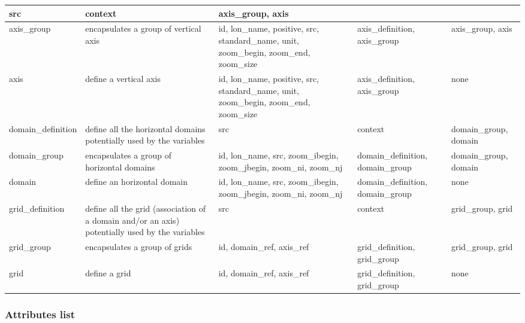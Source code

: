 \documentclass[NEMO_book]{subfiles}
\begin{document}
\begin{longtable}{|p{2.2cm}|p{2.5cm}|p{3.5cm}|p{2.2cm}|p{1.6cm}|}
   src &
   context &  
   axis\_group, axis \\
   \hline   
   axis\_group & 
   encapsulates a group of vertical axis &
   id, lon\_name, positive, src, standard\_name, unit, zoom\_begin, zoom\_end, zoom\_size &
   axis\_definition, axis\_group & 
   axis\_group, axis \\
   \hline   
   axis & 
   define a vertical axis &
   id, lon\_name, positive, src, standard\_name, unit, zoom\_begin, zoom\_end, zoom\_size &
   axis\_definition, axis\_group  & 
   none \\
   \hline   
   \hline   
   domain\_\-definition & 
   define all the horizontal domains potentially used by the variables &
   src &
   context & 
   domain\_\-group, domain \\
   \hline   
   domain\_group & 
   encapsulates a group of horizontal domains &
   id, lon\_name, src, zoom\_ibegin, zoom\_jbegin, zoom\_ni, zoom\_nj &
   domain\_\-definition, domain\_group & 
   domain\_\-group, domain \\
   \hline   
   domain & 
   define an horizontal domain &
   id, lon\_name, src, zoom\_ibegin, zoom\_jbegin, zoom\_ni, zoom\_nj &
   domain\_\-definition, domain\_group & 
   none \\
   \hline   
   \hline   
   grid\_definition & 
   define all the grid (association of a domain and/or an axis) potentially used by the variables &
   src &
   context & 
   grid\_group, grid \\
   \hline   
   grid\_group & 
   encapsulates a group of grids &
   id, domain\_ref, axis\_ref &
   grid\_definition, grid\_group & 
   grid\_group, grid \\
   \hline   
   grid & 
   define a grid &
   id, domain\_ref, axis\_ref &
   grid\_definition, grid\_group & 
   none \\
   \hline   
\end{longtable}


\subsubsection{Attributes list}
\end{document}
